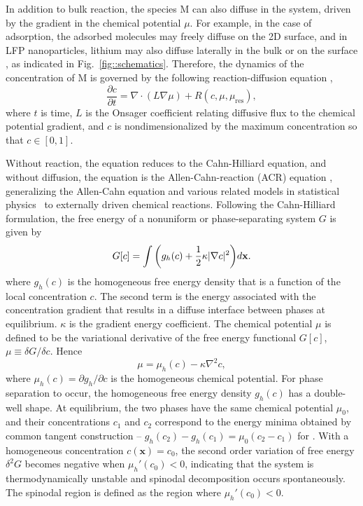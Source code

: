 \documentclass[reprint,aps,pre,superscriptaddress]{revtex4-2}
\newcommand{\pderiv}[2]{\frac{\partial {#1}}{\partial {#2}}}
\let\originalleft\left
\let\originalright\right
\renewcommand{\left}{\mathopen{}\mathclose\bgroup\originalleft}
\renewcommand{\right}{\aftergroup\egroup\originalright}
\begin{document}
In addition to bulk reaction, the species M can also diffuse in the system, driven by the gradient in the chemical potential $\mu$. For example, in the case of adsorption, the adsorbed molecules may freely diffuse on the 2D surface, and in LFP nanoparticles, lithium may also diffuse laterally in the bulk or on the surface \cite{Li2018a,malik2010}, as indicated in Fig.~\ref{fig::schematics}.
Therefore, the dynamics of the concentration of M is governed by the following reaction-diffusion equation \cite{Bazant2013,Bazant2017},
\begin{equation} \label{eqn::PDE}
  \pderiv{c}{t} = \nabla \cdot (L \nabla \mu) + R(c,\mu,\mu_\text{res}),
\end{equation}
where $t$ is time, $L$ is the Onsager coefficient relating diffusive flux to the chemical potential gradient, and $c$ is nondimensionalized by the maximum concentration so that $c\in[0,1]$.

Without reaction, the equation reduces to the Cahn-Hilliard equation, and without diffusion, the equation is the Allen-Cahn-reaction (ACR) equation \cite{Bazant2013}, generalizing the Allen-Cahn equation and various related models in statistical physics~\cite{hohenberg1977theory} to externally driven chemical reactions.
Following the Cahn-Hilliard formulation, the free energy of a nonuniform or phase-separating system $G$ is given by
\begin{equation}
  \label{eqn::chemical_free_energy}
  G[c] = \int{\left( g_h(c) + \frac{1}{2} \kappa |\nabla c|^2 \right) d\mathbf{x}}.
\end{equation}
where $g_h(c)$ is the homogeneous free energy density that is a function of the local concentration $c$. The second term is the energy associated with the concentration gradient that results in a diffuse interface between phases at equilibrium. $\kappa$ is the gradient energy coefficient.
The chemical potential $\mu$ is defined to be the variational derivative of the free energy functional $G[c]$, $\mu \equiv \delta G / \delta c$.
Hence
\begin{equation} \label{eqn::chemical_potential}
  \mu = \mu_h(c) - \kappa \nabla^2c,
\end{equation}
where $\mu_h(c) = \partial g_h / \partial c$ is the homogeneous chemical potential.
For phase separation to occur, the homogeneous free energy density $g_h(c)$ has a double-well shape. At equilibrium, the two phases have the same chemical potential $\mu_0$, and their concentrations $c_1$ and $c_2$ correspond to the energy minima obtained by common tangent construction -- $g_h(c_2)-g_h(c_1) = \mu_0 (c_2-c_1)$ for \cite{CahnJohnE.1958}. With a homogeneous concentration $c(\mathbf{x})=c_0$, the second order variation of free energy $\delta^2 G$ becomes negative when $\mu_h'(c_0)<0$, indicating that the system is thermodynamically unstable and spinodal decomposition occurs spontaneously. The spinodal region is defined as the region where $\mu_h'(c_0)<0$.
\end{document}
